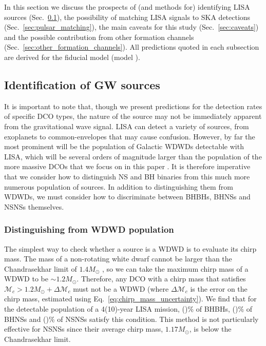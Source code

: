 In this section we discuss the prospects of (and methods for) identifying LISA sources (Sec.~\ref{sec:identify_sources}), the possibility of matching LISA signals to SKA detections (Sec.~\ref{sec:pulsar_matching}), the main caveats for this study (Sec.~\ref{sec:caveats}) and the possible contribution from other formation channels (Sec.~\ref{sec:other_formation_channels}). All predictions quoted in each subsection are derived for the fiducial model (model \modFid{}).

\subsection{Identification of GW sources}\label{sec:identify_sources}
It is important to note that, though we present predictions for the detection rates of specific DCO types, the nature of the source may not be immediately  apparent from the gravitational wave signal. LISA can detect a variety of sources, from exoplanets \citep[e.g.][]{Tamanini+2019} to common-envelopes \citep[e.g.][]{Ginat+2020, Renzo+2021} that may cause confusion. However, by far the most prominent will be the population of Galactic WDWDs detectable with LISA, which will be several orders of magnitude larger than the population of the more massive DCOs that we focus on in this paper \citep[e.g.][]{Korol+2017}. It is therefore imperative that we consider how to distinguish NS and BH binaries from this much more numerous population of sources. In addition to distinguishing them from WDWDs, we must consider how to discriminate between BHBHs, BHNSs and NSNSs themselves.

\subsubsection{Distinguishing from WDWD population}\label{sec:WDWD_distinguish}
The simplest way to check whether a source is a WDWD is to evaluate its chirp mass. The mass of a non-rotating white dwarf cannot be larger than the Chandrasekhar limit of $1.4 \unit{M_\odot}$ \citep{Chandrasekhar+1931, Hamada+1961}, so we can take the maximum chirp mass of a WDWD to be ${\sim}1.2 \unit{M_{\odot}}$. Therefore, any DCO with a chirp mass that satisfies $\mathcal{M}_c > 1.2 \unit{M_{\odot}} + \Delta \mathcal{M}_c$ must not be a WDWD (where $\Delta \mathcal{M}_c$ is the error on the chirp mass, estimated using Eq.~\ref{eq:chirp_mass_uncertainty}). We find that for the detectable population of a 4(10)-year LISA mission, \BHBHAboveMaxWDWDFourPerc{}(\BHBHAboveMaxWDWDTenPerc{})\% of BHBHs, \BHNSAboveMaxWDWDFourPerc{}(\BHNSAboveMaxWDWDTenPerc{})\% of BHNSs and \NSNSAboveMaxWDWDFourPerc{}(\NSNSAboveMaxWDWDTenPerc{})\% of NSNSs satisfy this condition. This method is not particularly effective for NSNSs since their average chirp mass, $1.17 \unit{M_\odot}$, is below the Chandrasekhar limit.

